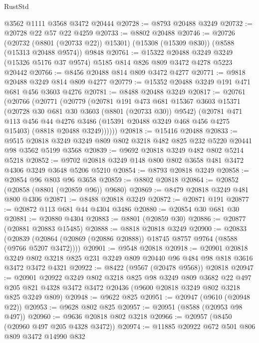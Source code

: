 \begin{lexlean}{RustStd}
\begin{coremodule}
    @3562
    @1111
    @3568
    @3472
    @20444
@20728 := @8793 @20488 @3249
@20732 := @20728 @22 @57 @22 @4259
@20733 := @8802 @20488
@20746 := @20726
    (@20732 (@8801 (@20733 @22)) @15301)
    (@15308 (@15309 @830))
    (@8588 (@15313 @20488 @9574))
    @9848
@20761 := @15322
    @20488
    @3249
    @3249
    (@15326 @5176 @37 @9574)
    @5185
    @814
    @826
    @809
    @3472
    @4278
    @5223
    @20442
@20766 := @8456 @20488 @814 @809 @3472 @4277
@20771 := @9818 @20488 @3249 @814 @809 @4277
@20779 := @15352 @20488 @3249 @191 @471 @681 @456 @3603 @4276
@20781 := @8488 @20488 @3249
@20817 := @20761
    (@20766
      (@20771
        (@20779
          (@20781
            @191
            @473
            @681
            @15367
            @3603
            @15371
            (@20728 @30 @681 @30 @3603 (@8801 (@20733 @30)) @9542)
            (@20781
              @471
              @113
              @456
              @44
              @4276
              @3486
              (@15391 @20488 @3249 @468 @456 @4275 @15403)
              (@8818 @20488 @3249))))))
@20818 := @15416 @20488
@20833 := @9515 @20818 @3249 @3249 @809 @802 @3218 @482 @825 @232 @5220 @20441 @98 @3562 @5199 @3568
@20839 := @9692 @20818 @3249 @482 @802 @5214 @5218
@20852 := @9702 @20818 @3249 @148 @800 @802 @3658 @481 @3472 @4306 @3249 @3648 @5206 @5210
@20854 := @8793 @20818 @3249
@20858 := @20854 @96 @803 @96 @3658
@20859 := @8802 @20818
@20864 := @20852 (@20858 (@8801 (@20859 @96)) @9680)
@20869 := @8479 @20818 @3249 @481 @800 @4306
@20871 := @8488 @20818 @3249
@20872 := @20871 @191
@20877 := @20872 @113 @681 @44 @4304 @3486
@20880 := @20854 @30 @681 @30
@20881 := @20880 @4304
@20883 := @8801 (@20859 @30)
@20886 := @20877 (@20881 @20883 @15485)
@20888 := @8818 @20818 @3249
@20900 := @20833
    (@20839 (@20864 (@20869 (@20886 @20888)) @18745 @8757 @9764 (@8588 (@9766 @5207 @3472))))
@20901 := @9548 @20818
@20918 := @20901
    @20818
    @3249
    @802
    @3218
    @825
    @231
    @3249
    @809
    @20440
    @96
    @484
    @98
    @818
    @3616
    @3472
    @3472
    @4321
@20922 := @8422 (@9567 (@20478 @9568)) @20818
@20947 := @20901
    @20922
    @3249
    @802
    @3218
    @825
    @98
    @3249
    @809
    @3682
    @22
    @497
    @205
    @821
    @4328
    @3472
    @3472
    @20436
    (@9600 @20818 @3249 @802 @3218 @825 @3249 @809)
@20948 := @9622 @825
@20951 := @20947 (@9610 (@20948 @22))
@20953 := @9628 @802 @825
@20957 := @20951 (@8588 (@20953 @98 @497))
@20960 := @9636 @20818 @802 @3218
@20966 := @20957 (@8450 (@20960 @497 @205 @4328 @3472))
@20974 := @11885 @20922 @672 @501 @806 @809 @3472 @14990 @832

\end{coremodule}
\end{lexlean}
